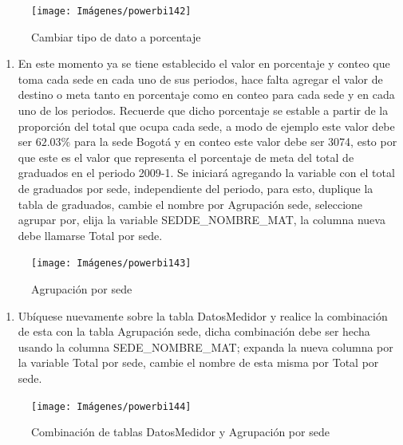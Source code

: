 \documentclass[
]{book}
\providecommand{\tightlist}{%
  \setlength{\itemsep}{0pt}\setlength{\parskip}{0pt}}
\begin{document}
\begin{figure}

{\centering \texttt{[image: Imágenes/powerbi142]} 

}

\caption{Cambiar tipo de dato a porcentaje}\label{fig:columnapersonalizadadeporcentajeperiodocambiaraporcetaje-fig}
\end{figure}

\begin{enumerate}
\def\labelenumi{\arabic{enumi}.}
\setcounter{enumi}{10}
\tightlist
\item
  En este momento ya se tiene establecido el valor en porcentaje y conteo que toma cada sede en cada uno de sus periodos, hace falta agregar el valor de destino o meta tanto en porcentaje como en conteo para cada sede y en cada uno de los periodos. Recuerde que dicho porcentaje se estable a partir de la proporción del total que ocupa cada sede, a modo de ejemplo este valor debe ser \(62.03\%\) para la sede Bogotá y en conteo este valor debe ser 3074, esto por que este es el valor que representa el porcentaje de meta del total de graduados en el periodo 2009-1. Se iniciará agregando la variable con el total de graduados por sede, independiente del periodo, para esto, duplique la tabla de graduados, cambie el nombre por Agrupación sede, seleccione agrupar por, elija la variable SEDDE\_NOMBRE\_MAT, la columna nueva debe llamarse Total por sede.
\end{enumerate}

\begin{figure}

{\centering \texttt{[image: Imágenes/powerbi143]} 

}

\caption{Agrupación por sede}\label{fig:agrupacionporsede-fig}
\end{figure}

\begin{enumerate}
\def\labelenumi{\arabic{enumi}.}
\setcounter{enumi}{11}
\tightlist
\item
  Ubíquese nuevamente sobre la tabla DatosMedidor y realice la combinación de esta con la tabla Agrupación sede, dicha combinación debe ser hecha usando la columna SEDE\_NOMBRE\_MAT; expanda la nueva columna por la variable Total por sede, cambie el nombre de esta misma por Total por sede.
\end{enumerate}

\begin{figure}

{\centering \texttt{[image: Imágenes/powerbi144]} 

}

\caption{Combinación de tablas DatosMedidor y Agrupación por sede}\label{fig:combinaciondatosmedidoryagrupacionsede-fig}
\end{figure}
\end{document}
